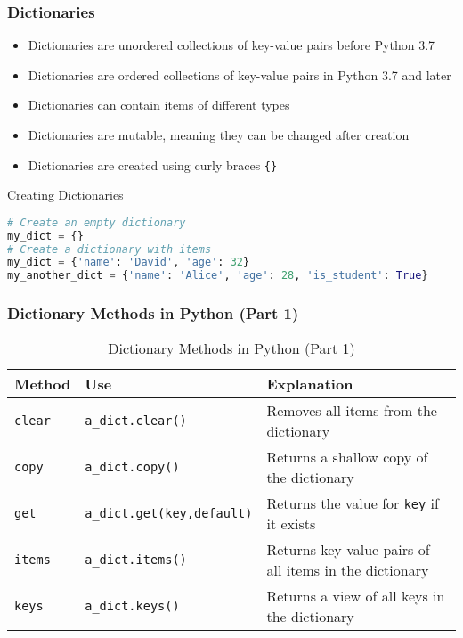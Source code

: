 \begin{frame}
    \frametitle{Dictionaries}
    \begin{itemize}
        \item Dictionaries are unordered collections of key-value pairs before Python 3.7
        \item Dictionaries are ordered collections of key-value pairs in Python 3.7 and later
        \item Dictionaries can contain items of different types
        \item Dictionaries are mutable, meaning they can be changed after creation
        \item Dictionaries are created using curly braces \texttt{\{\}}
    \end{itemize}
\end{frame}

\begin{frame}[fragile]{Creating Dictionaries}
    \begin{lstlisting}[style=colorful, language=Python]
# Create an empty dictionary
my_dict = {}
# Create a dictionary with items
my_dict = {'name': 'David', 'age': 32}
my_another_dict = {'name': 'Alice', 'age': 28, 'is_student': True}
    \end{lstlisting}
\end{frame} 

\begin{frame}
\frametitle{Dictionary Methods in Python (Part 1)}
\begin{table}[]
    \centering
    \begin{tabular}{|l|l|p{5cm}|}
        \hline
        \textbf{Method} & \textbf{Use} & \textbf{Explanation} \\ \hline
        \texttt{clear} & \texttt{a\_dict.clear()} & Removes all items from the dictionary \\ \hline
        \texttt{copy} & \texttt{a\_dict.copy()} & Returns a shallow copy of the dictionary \\ \hline
        \texttt{get} & \texttt{a\_dict.get(key,default)} & Returns the value for \texttt{key} if it exists \\ \hline
        \texttt{items} & \texttt{a\_dict.items()} & Returns key-value pairs of all items in the dictionary \\ \hline
        \texttt{keys} & \texttt{a\_dict.keys()} & Returns a view of all keys in the dictionary \\ \hline
    \end{tabular}
    \caption{Dictionary Methods in Python (Part 1)}
\end{table} 
\end{frame}

